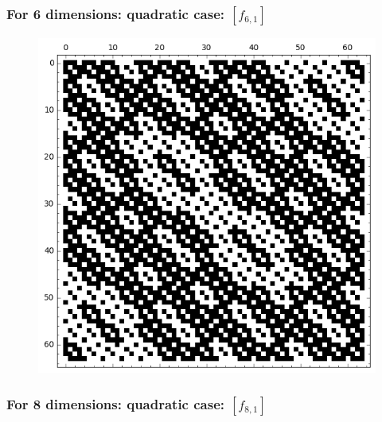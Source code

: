 \documentclass[pdf,sprung,slideColor,nocolorBG]{beamer}
\newenvironment{colortheme}[1]{
\def\ProvidesPackageRCS $##1${\relax}
\renewcommand{\ProcessOptions}{\relax}
\makeatletter

\makeatother
}{}
\begin{document}
\begin{colortheme}{jubata}
\begin{frame}
\begin{figure}
\begin{minipage}{.48\textwidth}
  \label{fig:q4_1_bent_cayley_graph_index_matrix}
\end{minipage}
\end{figure}
\end{frame}
\begin{frame}
\frametitle{For 6 dimensions: quadratic case: $[f_{6,1}]$}
\begin{figure}
\centering
\begin{minipage}{.48\textwidth}
  \centering
  \includegraphics[width=.9\linewidth]{../matrix_plot/c6_1_bent_cayley_graph_index_matrix.png}
  \label{fig:q6_1_bent_cayley_graph_index_matrix}
\end{minipage}
\end{figure}
\end{frame}
\begin{frame}
\frametitle{For 8 dimensions: quadratic case: $[f_{8,1}]$}
\begin{figure}
\centering
\begin{minipage}{.48\textwidth}
  \centering

\end{minipage}
\end{figure}
\end{frame}
\end{colortheme}
\end{document}

